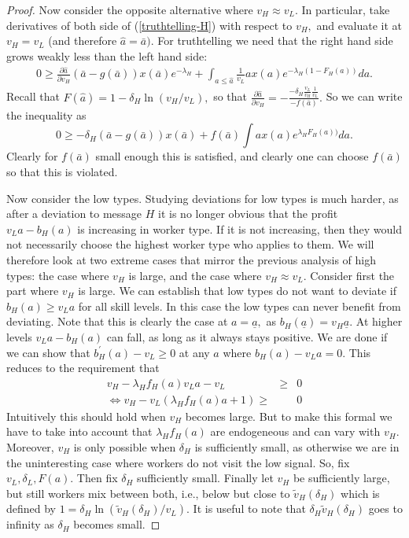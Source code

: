\documentclass[12pt]{article}
\begin{document}
\begin{proof}
Now consider the opposite alternative where $v_{H}\approx v_{L}.$
In particular, take derivatives of both side of (\ref{truthtelling-H}) with respect to $v_{H},$ and evaluate it at $v_{H}=v_{L}$ (and therefore $\hat{a}=\bar{a}).$
For truthtelling we need that the right hand side grows weakly less than the left hand side:%
\begin{align*}
0\geq \frac{\partial \hat{a}}{\partial v_{H}}(\bar{a}-g(\bar{a}))x(\bar{a}%
)e^{-\lambda _{H}}+\int_{a\leq \hat{a}}\frac{1}{v_{L}}ax(a)e^{-\lambda
_{H}(1-F_{H}(a))}da. 
\end{align*}
Recall that $F(\hat{a})=1-\delta _{H}\ln (v_{H}/v_{L}),$ so that $\frac{\partial \hat{a}}{\partial v_{H}}=-\frac{-\delta _{H}\frac{v_{L}}{v_{H}}\frac{1}{v_{L}}}{-f(\bar{a})}.$ So we can write the inequality as 
\[
0\geq -\delta _{H}(\bar{a}-g(\bar{a}))x(\bar{a})+f(\bar{a})\int
ax(a)e^{\lambda _{H}F_{H}(a))}da. 
\]%
Clearly for $f(\bar{a})$ small enough this is satisfied, and clearly one can choose $f(\bar{a})$ so that this is violated.

Now consider the low types.
Studying deviations for low types is much harder, as after a deviation to message $H$ it is no longer obvious that the profit $v_{L}a-b_{H}(a)$ is increasing in worker type.
If it is not increasing, then they would not necessarily choose the highest worker type who applies to them.
We will therefore look at two extreme cases that mirror the previous analysis of high types: the case where $v_{H}$ is large, and the case where $v_{H}\approx v_{L}.$
Consider first the part where $v_{H}$ is large.
We can establish that low types do not want to deviate if $b_{H}(a)\geq v_{L}a$ for all skill levels.
In this case the low types can never benefit from deviating. Note that this is clearly the case at $a=\underline{a},$ as $b_{H}(\underline{a})=v_{H}\underline{a}.$
At higher levels $v_{L}a-b_{H}(a)$ can fall, as long as it always stays positive.
We are done if we can show that $b_{H}^{\prime }(a)-v_{L}\geq 0$ at any $a$ where $b_{H}(a)-v_{L}a=0.$
This reduces to the requirement that 
\begin{eqnarray}
v_{H}-\lambda _{H}f_{H}(a)v_{L}a-v_{L} &\geq &0  \nonumber \\
\Leftrightarrow v_{H}-v_{L}(\lambda _{H}f_{H}(a)a+1)\geq &&0  \label{inequ}
\end{eqnarray}%
Intuitively this should hold when $v_{H}$ becomes large.
But to make this formal we have to take into account that $\lambda _{H}f_{H}(a)$ are endogeneous and can vary with $v_{H}.$
Moreover, $v_{H}$ is only possible when $\delta _{H}$ is sufficiently small, as otherwise we are in the uninteresting case where workers do not visit the low signal.
So, fix $v_{L},\delta _{L},F(a).$ Then fix $\delta _{H}$ sufficiently small.
Finally let $v_{H}$ be sufficiently large, but still workers mix between both, i.e., below but close to $\tilde{v}_{H}(\delta _{H})$ which is defined by $1=\delta _{H}\ln (\tilde{v}_{H}(\delta _{H})/v_{L}).$
It is useful to note that $\delta _{H}\tilde{v}_{H}(\delta _{H})$ goes to infinity as $\delta_{H} $ becomes small.


\end{proof}
\end{document}
